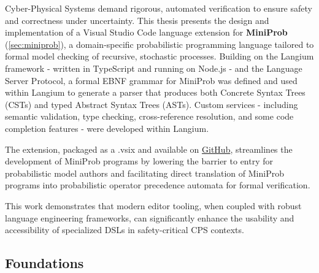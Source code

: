 \documentclass[11pt]{report}
\begin{document}
\noindent
Cyber-Physical Systems demand rigorous, automated verification to ensure safety and correctness under uncertainty. This thesis presents the design and implementation of
a Visual Studio Code language extension for \textbf{MiniProb} (\ref{sec:miniprob}), a domain-specific probabilistic programming language tailored to formal model
checking of recursive, stochastic processes. Building on the Langium framework - written in TypeScript and running on Node.js - and the Language Server Protocol,
a formal EBNF grammar for MiniProb was defined and used within Langium to generate a parser that produces both Concrete Syntax Trees (CSTs) and
typed Abstract Syntax Trees (ASTs). Custom services - including semantic validation, type checking, cross-reference resolution, and some code completion features -
were developed within Langium.

\vspace{1ex}

\noindent
The extension, packaged as a .vsix and available on \hyperlink{https://github.com/e12224207/miniprob}{GitHub}, streamlines the development of MiniProb programs 
by lowering the barrier to entry for probabilistic model authors and facilitating direct translation of MiniProb programs into probabilistic operator precedence
automata for formal verification.

\vspace{1ex}

\noindent
This work demonstrates that modern editor tooling, when coupled with robust language engineering frameworks, can significantly enhance the usability and accessibility
of specialized DSLs in safety-critical CPS contexts.

\clearpage

\begin{flushright}
  {\Huge\bfseries \contentsname\par}
\end{flushright}
\begingroup
  \renewcommand{\contentsname}{\vspace{-1cm}}%
  \tableofcontents
\endgroup

\cleardoublepage
{}

\begin{refsection}
  \part{Foundations}
  
\end{refsection}
\end{document}
